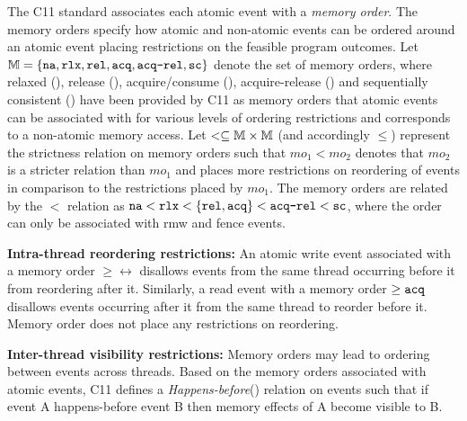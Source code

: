 The C11 standard \cite{C11} associates each atomic event with 
a {\em memory order}. The memory orders specify how atomic and
non-atomic events can be ordered around an atomic event placing
restrictions on the feasible program outcomes.
%
Let $\mathbb{M} = \{\texttt{na},\texttt{rlx},\texttt{rel},\texttt{acq},\texttt{acq-rel},\texttt{sc}\}$ denote the set 
of memory orders, where relaxed (\rlx), release (\rel),
acquire/consume (\acq), acquire-release (\ar) and sequentially
consistent (\sc) have been provided by C11 as memory orders that 
atomic events can be associated with for various levels
of ordering restrictions and \na corresponds to a non-atomic
memory access.
%
Let $< \subseteq \mathbb{M} \times \mathbb{M}$ (and accordingly $\le$) 
represent the strictness relation on memory orders such that 
$mo_1 < mo_2$ denotes that $mo_2$ is a stricter relation than 
$mo_1$ and places more restrictions on reordering of events in 
comparison to the restrictions placed by $mo_1$. 
%
The memory orders are related by the $<$ relation as $\texttt{na} < \texttt{rlx}
< \{\texttt{rel},\texttt{acq}\} < \texttt{acq-rel} < \texttt{sc}$, where the order \ar can only be
associated with rmw and fence events.

\noindent
{\bf Intra-thread reordering restrictions:} 
An atomic write event associated
with a memory order  $\ge \rel$ disallows events from the same 
thread occurring before it from reordering after it. 
%
Similarly, a read event with a memory order $\ge \texttt{acq}$ disallows
events occurring after it from the same thread to reorder before it.
%
Memory order \rlx does not place any restrictions on reordering.

\noindent
{\bf Inter-thread visibility restrictions:}
Memory orders may lead to ordering between events across threads. 
Based on the memory orders associated with atomic events, 
C11 defines a {\em Happens-before}(\setHB) relation on events such 
that if event A happens-before event B then memory effects of A 
become visible to B.
